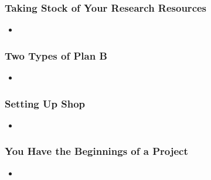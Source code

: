 \documentclass[11pt]{article}
\begin{document}
\subsubsection{Taking Stock of Your Research Resources}
\begin{itemize}
\item 
\end{itemize}

\subsubsection{Two Types of Plan B}
\begin{itemize}
\item 
\end{itemize}

\subsubsection{Setting Up Shop}
\begin{itemize}
\item 
\end{itemize}

\subsubsection{You Have the Beginnings of a Project}
\begin{itemize}
\item 
\end{itemize}
\end{document}
